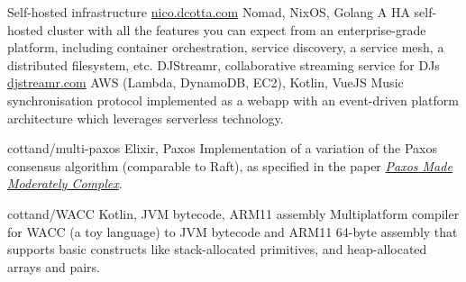 \begin{entrylist}
    \projEntry
    {Self-hosted infrastructure}
    {\href{https://nico.dcotta.com/projects/selfhosted-homelab}{nico.dcotta.com}}
    {Nomad, NixOS, Golang}
    {
        A HA self-hosted cluster with all the features you can expect from an enterprise-grade platform,
        including container orchestration, service discovery, a service mesh, a distributed filesystem, etc.
    }
    \projEntry
    {DJStreamr, collaborative streaming service for DJs}
    {\href{https://djstreamr.com}{djstreamr.com}}
    {AWS (Lambda, DynamoDB, EC2), Kotlin, VueJS}
    {
        Music synchronisation protocol implemented as a webapp with an event-driven platform
        architecture which leverages serverless technology.
    }

    {cottand/multi-paxos}
    {Elixir, Paxos}
    {
        Implementation of a variation of the Paxos consensus algorithm (comparable to Raft), as specified in the paper
    \href{https://dl.acm.org/citation.cfm?id=2673577}{\textit{Paxos Made Moderately Complex}}.
    }

    {cottand/WACC}
    {Kotlin, JVM bytecode, ARM11 assembly}
    {
        Multiplatform compiler for WACC (a toy language) to JVM bytecode and ARM11 64-byte assembly
    that supports basic constructs like stack-allocated primitives, and heap-allocated arrays
    and pairs.
    }





\end{entrylist}

